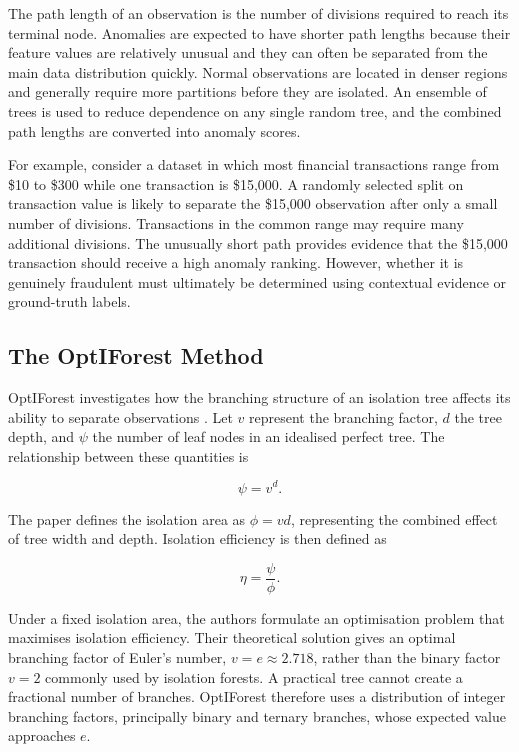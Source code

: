 \documentclass[11pt]{article}
\begin{document}
The path length of an observation is the number of divisions required
to reach its terminal node. Anomalies are expected to have shorter path
lengths because their feature values are relatively unusual and they
can often be separated from the main data distribution quickly. Normal
observations are located in denser regions and generally require more
partitions before they are isolated. An ensemble of trees is used to
reduce dependence on any single random tree, and the combined path
lengths are converted into anomaly scores.

For example, consider a dataset in which most financial transactions
range from \$10 to \$300 while one transaction is \$15,000. A randomly
selected split on transaction value is likely to separate the \$15,000
observation after only a small number of divisions. Transactions in the
common range may require many additional divisions. The unusually
short path provides evidence that the \$15,000 transaction should
receive a high anomaly ranking. However, whether it is genuinely
fraudulent must ultimately be determined using contextual evidence or
ground-truth labels.


\subsection{The OptIForest Method}
OptIForest investigates how the branching structure of an isolation
tree affects its ability to separate observations
\citep{xiang2023optiforest}. Let \(v\) represent the branching factor,
\(d\) the tree depth, and \(\psi\) the number of leaf nodes in an
idealised perfect tree. The relationship between these quantities is

\[
\psi = v^d.
\]

The paper defines the isolation area as \(\phi = vd\), representing the
combined effect of tree width and depth. Isolation efficiency is then
defined as

\[
\eta = \frac{\psi}{\phi}.
\]

Under a fixed isolation area, the authors formulate an optimisation
problem that maximises isolation efficiency. Their theoretical solution
gives an optimal branching factor of Euler's number,
\(v=e\approx2.718\), rather than the binary factor \(v=2\) commonly used
by isolation forests. A practical tree cannot create a fractional
number of branches. OptIForest therefore uses a distribution of integer
branching factors, principally binary and ternary branches, whose
expected value approaches \(e\).
\end{document}
